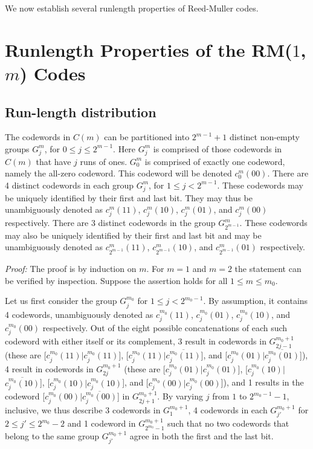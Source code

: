 We now establish several runlength properties of Reed-Muller
codes.

\section{Runlength Properties of the RM($1$,$m$)
Codes}\label{sectionRM2}

\subsection{Run-length distribution}\label{sectionRM21}
\begin{lemma}\label{Lem1}
The codewords in $C(m)$ can
be partitioned into $2^{m-1}+1$ distinct
non-empty groups $G_j^m$,
for $0 \leq j \leq 2^{m-1}$.
Here $G_j^m$ is comprised of
those codewords in $C(m)$ that have
$j$ runs of ones.
$G_0^m$ is comprised of
exactly one codeword, namely the all-zero codeword. This codeword will be denoted
$c_0^m(00)$.
There are 4 distinct codewords in each
group $G_j^m$, for $1 \le j  < 2^{m-1}$.
These codewords may be uniquely identified
by their first and last bit. They may
thus be unambiguously denoted as
$c_j^m(11)$, $c_j^m(10)$, $c_j^m(01)$,
and  $c_j^m(00)$ respectively.
There are 3 distinct
codewords in the group $G_{2^{m-1}}^m$.
These codewords may also be uniquely identified
by their first and last bit and may
be unambiguously denoted as
$c_{2^{m-1}}^m(11)$,
$c_{2^{m-1}}^m(10)$,
and  $c_{2^{m-1}}^m(01)$ respectively.
\end{lemma}

\noindent \textit{Proof:} The proof is by induction on $m$. For
$m=1$ and $m=2$ the statement can be verified by inspection.
Suppose the assertion holds for all $1 \le m \le m_0$.

Let us first consider the group $G_j^{m_0}$ for $1 \leq j <
2^{m_0-1}$. By assumption, it contains 4 codewords, unambiguously denoted
as  $c_j^{m_0}(11)$,
$c_j^{m_0}(01)$, $c_j^{m_0}(10)$, and $c_j^{m_0}(00)$ respectively.
Out of the eight possible concatenations of each such codeword with either itself or its complement, 3 result in codewords in
$G_{2j-1}^{m_0+1}$ (these are [$c_j^{m_0}(11)|c_j^{m_0}(11)$],
[$c_j^{m_0}(11)|$$\overline{c_j^{m_0}(11)}$], and
[$c_j^{m_0}(01)|$$\overline{c_j^{m_0}(01)}$]), 4 result in codewords
in $G_{2j}^{m_0+1}$ (these are [$c_j^{m_0}(01)|c_j^{m_0}(01)$],
[$c_j^{m_0}(10)|$ $\overline{c_j^{m_0}(10)}$],
[$c_j^{m_0}(10)|c_j^{m_0}(10)$], and
[$c_j^{m_0}(00)|c_j^{m_0}(00)$]), and 1 results in the codeword
[$c_j^{m_0}(00)|$$\overline{c_j^{m_0}(00)}$] in $G_{2j+1}^{m_0+1}$.
By varying $j$ from $1$ to $2^{m_0-1}-1$, inclusive,
we thus describe 3 codewords in $G_1^{m_0+1}$, 4 codewords in each
$G_{j'}^{m_0+1}$ for $ 2 \leq j' \leq 2^{m_0}-2$ and 1 codeword in
$G_{2^{m_0}-1}^{m_0+1}$ such that no two codewords that belong to
the same group $G_{j'}^{m_0+1}$ agree in both the first and the last bit.

